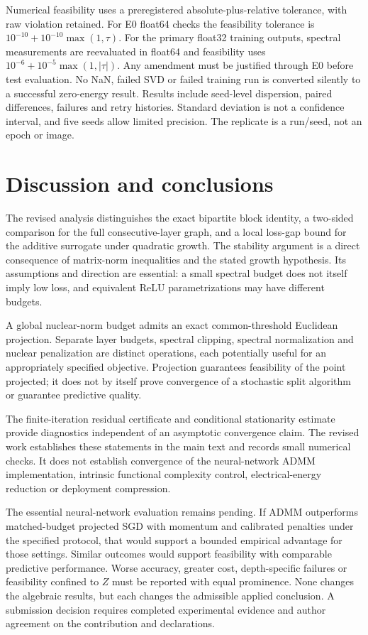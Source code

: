 Numerical feasibility uses a preregistered absolute-plus-relative tolerance, with raw violation retained. For E0 float64 checks the feasibility tolerance is $10^{-10}+10^{-10}\max(1,\tau)$. For the primary float32 training outputs, spectral measurements are reevaluated in float64 and feasibility uses $10^{-6}+10^{-5}\max(1,|\tau|)$. Any amendment must be justified through E0 before test evaluation. No NaN, failed SVD or failed training run is converted silently to a successful zero-energy result. Results include seed-level dispersion, paired differences, failures and retry histories. Standard deviation is not a confidence interval, and five seeds allow limited precision. The replicate is a run/seed, not an epoch or image.

\section{Discussion and conclusions}\label{sec:conclusions}
The revised analysis distinguishes the exact bipartite block identity, a two-sided comparison for the full consecutive-layer graph, and a local loss-gap bound for the additive surrogate under quadratic growth. The stability argument is a direct consequence of matrix-norm inequalities and the stated growth hypothesis. Its assumptions and direction are essential: a small spectral budget does not itself imply low loss, and equivalent ReLU parametrizations may have different budgets.

A global nuclear-norm budget admits an exact common-threshold Euclidean projection. Separate layer budgets, spectral clipping, spectral normalization and nuclear penalization are distinct operations, each potentially useful for an appropriately specified objective. Projection guarantees feasibility of the point projected; it does not by itself prove convergence of a stochastic split algorithm or guarantee predictive quality.

The finite-iteration residual certificate and conditional stationarity estimate provide diagnostics independent of an asymptotic convergence claim. The revised work establishes these statements in the main text and records small numerical checks. It does not establish convergence of the neural-network ADMM implementation, intrinsic functional complexity control, electrical-energy reduction or deployment compression.

The essential neural-network evaluation remains pending. If ADMM outperforms matched-budget projected SGD with momentum and calibrated penalties under the specified protocol, that would support a bounded empirical advantage for those settings. Similar outcomes would support feasibility with comparable predictive performance. Worse accuracy, greater cost, depth-specific failures or feasibility confined to $Z$ must be reported with equal prominence. None changes the algebraic results, but each changes the admissible applied conclusion. A submission decision requires completed experimental evidence and author agreement on the contribution and declarations.

